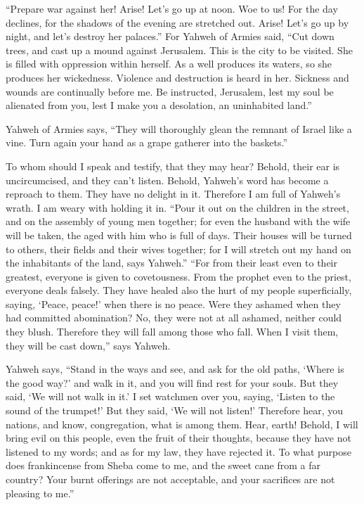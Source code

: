  ``Prepare war against her! Arise! Let's go up at noon. Woe
to us! For the day declines, for the shadows of the evening are
stretched out.  Arise! Let's go up by night, and let's
destroy her palaces.''  For Yahweh of Armies said, ``Cut
down trees, and cast up a mound against Jerusalem. This is the city to
be visited. She is filled with oppression within herself. 
As a well produces its waters, so she produces her wickedness. Violence
and destruction is heard in her. Sickness and wounds are continually
before me.  Be instructed, Jerusalem, lest my soul be
alienated from you, lest I make you a desolation, an uninhabited land.''

 Yahweh of Armies says, ``They will thoroughly glean the
remnant of Israel like a vine. Turn again your hand as a grape gatherer
into the baskets.''

 To whom should I speak and testify, that they may hear?
Behold, their ear is uncircumcised, and they can't listen. Behold,
Yahweh's word has become a reproach to them. They have no delight in it.
 Therefore I am full of Yahweh's wrath. I am weary with
holding it in. ``Pour it out on the children in the street, and on the
assembly of young men together; for even the husband with the wife will
be taken, the aged with him who is full of days.  Their
houses will be turned to others, their fields and their wives together;
for I will stretch out my hand on the inhabitants of the land, says
Yahweh.''  ``For from their least even to their greatest,
everyone is given to covetousness. From the prophet even to the priest,
everyone deals falsely.  They have healed also the hurt of
my people superficially, saying, `Peace, peace!' when there is no peace.
 Were they ashamed when they had committed abomination? No,
they were not at all ashamed, neither could they blush. Therefore they
will fall among those who fall. When I visit them, they will be cast
down,'' says Yahweh.

 Yahweh says, ``Stand in the ways and see, and ask for the
old paths, `Where is the good way?' and walk in it, and you will find
rest for your souls. But they said, `We will not walk in it.'
 I set watchmen over you, saying, `Listen to the sound of
the trumpet!' But they said, `We will not listen!' 
Therefore hear, you nations, and know, congregation, what is among them.
 Hear, earth! Behold, I will bring evil on this people,
even the fruit of their thoughts, because they have not listened to my
words; and as for my law, they have rejected it.  To what
purpose does frankincense from Sheba come to me, and the sweet cane from
a far country? Your burnt offerings are not acceptable, and your
sacrifices are not pleasing to me.''

